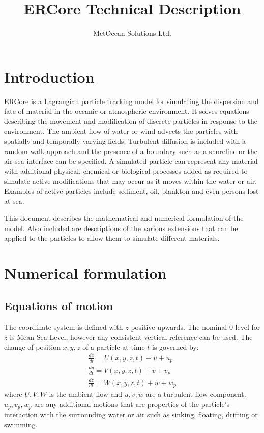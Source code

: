 \documentclass[a4paper]{article}
\title{ERCore Technical Description}
\author{MetOcean Solutions Ltd.}
\begin{document}
\maketitle

\section{Introduction}

ERCore is a Lagrangian particle tracking model for simulating the dispersion and fate of material in the oceanic or atmospheric environment.
It solves equations describing the movement and modification of discrete particles in response to the environment. The ambient flow of water or wind advects the particles with spatially and temporally varying fields.  
Turbulent diffusion is included with a random walk approach and the presence of a boundary such as a shoreline or the air-sea interface can be specified.
A simulated particle can represent any material with additional physical, chemical or biological processes added as required to simulate active modifications that may occur as it moves within the water or air.
Examples of active particles include sediment, oil, plankton and even persons lost at sea.

This document describes the mathematical and numerical formulation of the model.
Also included are descriptions of the various extensions that can be applied to the particles to allow them to simulate different materials.


\section{Numerical formulation}
\subsection{Equations of motion}
The coordinate system is defined with $z$ positive upwards. The nominal 0 level for $z$ is Mean Sea Level, however any consistent vertical reference can be used.
The change of position $x,y,z$ of a particle at time $t$ is governed by:\begin{align}
\frac{dx}{dt} = U(x,y,z,t)+\tilde{u}+u_p \\
\frac{dy}{dt} = V(x,y,z,t)+\tilde{v}+v_p \\ 
\frac{dz}{dt} = W(x,y,z,t)+\tilde{w}+w_p 
\end{align}
where $U,V,W$ is the ambient flow and $\tilde{u},\tilde{v},\tilde{w}$ are a turbulent flow component. $u_p,v_p,w_p$ are any additional motions that are properties of the particle's interaction with the surrounding water or air such as sinking, floating, drifting or swimming.
\end{document}
